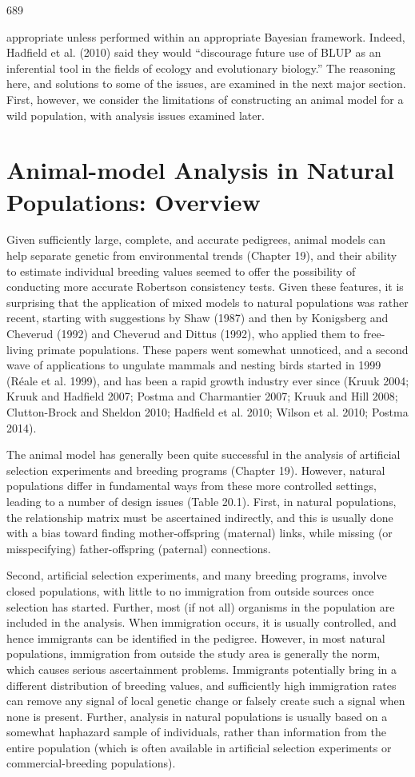 \documentclass{article}
\begin{document}
689

appropriate unless performed within an appropriate Bayesian framework. Indeed, Hadfield et al. (2010) said they would “discourage future use of BLUP as an inferential tool in the fields of ecology and evolutionary biology.” The reasoning here, and solutions to some of the issues, are examined in the next major section. First, however, we consider the limitations of constructing an animal model for a wild population, with analysis issues examined later.

\section{Animal-model Analysis in Natural Populations: Overview}
Given sufficiently large, complete, and accurate pedigrees, animal models can help separate genetic from environmental trends (Chapter 19), and their ability to estimate individual breeding values seemed to offer the possibility of conducting more accurate Robertson consistency tests. Given these features, it is surprising that the application of mixed models to natural populations was rather recent, starting with suggestions by Shaw (1987) and then by Konigsberg and Cheverud (1992) and Cheverud and Dittus (1992), who applied them to free-living primate populations. These papers went somewhat unnoticed, and a second wave of applications to ungulate mammals and nesting birds started in 1999 (Réale et al. 1999), and has been a rapid growth industry ever since (Kruuk 2004; Kruuk and Hadfield 2007; Postma and Charmantier 2007; Kruuk and Hill 2008; Clutton-Brock and Sheldon 2010; Hadfield et al. 2010; Wilson et al. 2010; Postma 2014).

The animal model has generally been quite successful in the analysis of artificial selection experiments and breeding programs (Chapter 19). However, natural populations differ in fundamental ways from these more controlled settings, leading to a number of design issues (Table 20.1). First, in natural populations, the relationship matrix must be ascertained indirectly, and this is usually done with a bias toward finding mother-offspring (maternal) links, while missing (or misspecifying) father-offspring (paternal) connections.

Second, artificial selection experiments, and many breeding programs, involve closed populations, with little to no immigration from outside sources once selection has started. Further, most (if not all) organisms in the population are included in the analysis. When immigration occurs, it is usually controlled, and hence immigrants can be identified in the pedigree. However, in most natural populations, immigration from outside the study area is generally the norm, which causes serious ascertainment problems. Immigrants potentially bring in a different distribution of breeding values, and sufficiently high immigration rates can remove any signal of local genetic change or falsely create such a signal when none is present. Further, analysis in natural populations is usually based on a somewhat haphazard sample of individuals, rather than information from the entire population (which is often available in artificial selection experiments or commercial-breeding populations).
\end{document}
